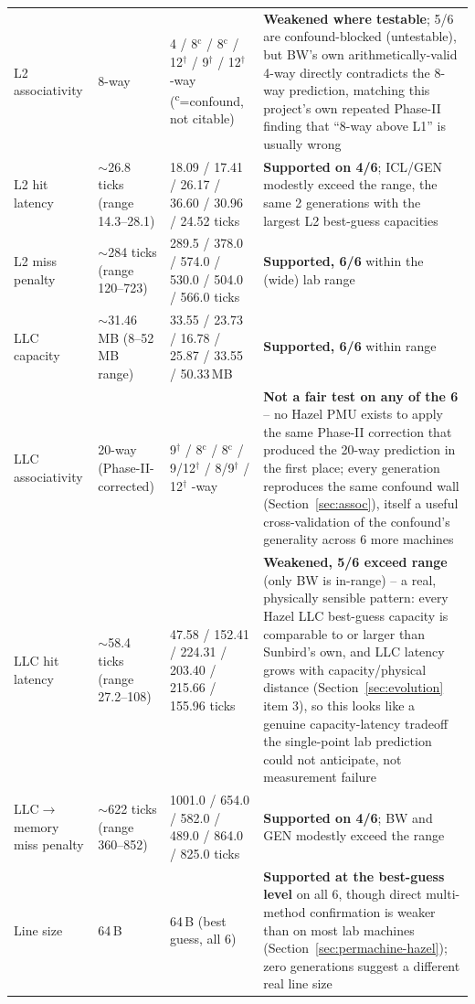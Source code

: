 \documentclass{article}
\begin{document}
\begin{table}[H]
{\begin{tabularx}{\textwidth}{|X|X|X|X|}
L2 associativity & 8-way & 4 / 8$^{\text{c}}$ / 8$^{\text{c}}$ / 12$^{\dagger}$ / 9$^{\dagger}$ / 12$^{\dagger}$ -way (\textsuperscript{c}=confound, not citable) & \textbf{Weakened where testable}; 5/6 are confound-blocked (untestable), but BW's own arithmetically-valid 4-way directly contradicts the 8-way prediction, matching this project's own repeated Phase-II finding that ``8-way above L1'' is usually wrong\\
L2 hit latency & $\sim$26.8 ticks (range 14.3--28.1) & 18.09 / 17.41 / 26.17 / 36.60 / 30.96 / 24.52 ticks & \textbf{Supported on 4/6}; ICL/GEN modestly exceed the range, the same 2 generations with the largest L2 best-guess capacities\\
L2 miss penalty & $\sim$284 ticks (range 120--723) & 289.5 / 378.0 / 574.0 / 530.0 / 504.0 / 566.0 ticks & \textbf{Supported, 6/6} within the (wide) lab range\\
LLC capacity & $\sim$31.46\,MB (8--52\,MB range) & 33.55 / 23.73 / 16.78 / 25.87 / 33.55 / 50.33\,MB & \textbf{Supported, 6/6} within range\\
LLC associativity & 20-way (Phase-II-corrected) & 9$^\dagger$ / 8$^{\text{c}}$ / 8$^{\text{c}}$ / 9/12$^\dagger$ / 8/9$^\dagger$ / 12$^\dagger$ -way & \textbf{Not a fair test on any of the 6} -- no Hazel PMU exists to apply the same Phase-II correction that produced the 20-way prediction in the first place; every generation reproduces the same confound wall (Section~\ref{sec:assoc}), itself a useful cross-validation of the confound's generality across 6 more machines\\
LLC hit latency & $\sim$58.4 ticks (range 27.2--108) & 47.58 / 152.41 / 224.31 / 203.40 / 215.66 / 155.96 ticks & \textbf{Weakened, 5/6 exceed range} (only BW is in-range) -- a real, physically sensible pattern: every Hazel LLC best-guess capacity is comparable to or larger than Sunbird's own, and LLC latency grows with capacity/physical distance (Section~\ref{sec:evolution} item 3), so this looks like a genuine capacity-latency tradeoff the single-point lab prediction could not anticipate, not measurement failure\\
LLC$\to$memory miss penalty & $\sim$622 ticks (range 360--852) & 1001.0 / 654.0 / 582.0 / 489.0 / 864.0 / 825.0 ticks & \textbf{Supported on 4/6}; BW and GEN modestly exceed the range\\
Line size & 64\,B & 64\,B (best guess, all 6) & \textbf{Supported at the best-guess level} on all 6, though direct multi-method confirmation is weaker than on most lab machines (Section~\ref{sec:permachine-hazel}); zero generations suggest a different real line size\\

\end{tabularx}}
\end{table}
\end{document}
